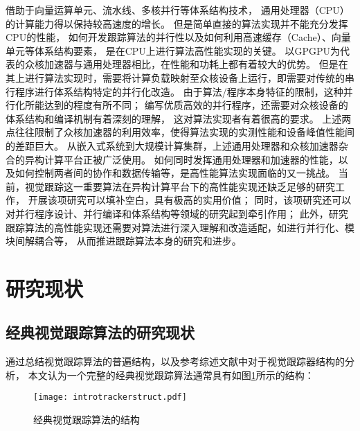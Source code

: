 借助于向量运算单元、流水线、多核并行等体系结构技术，
通用处理器（CPU）的计算能力得以保持较高速度的增长。
但是简单直接的算法实现并不能充分发挥CPU的性能，
如何开发跟踪算法的并行性以及如何利用高速缓存（Cache）、向量单元等体系结构要素，
是在CPU上进行算法高性能实现的关键。
以GPGPU为代表的众核加速器与通用处理器相比，在性能和功耗上都有着较大的优势。
但是在其上进行算法实现时，需要将计算负载映射至众核设备上运行，即需要对传统的串行程序进行体系结构特定的并行化改造。
由于算法/程序本身特征的限制，这种并行化所能达到的程度有所不同；
编写优质高效的并行程序，还需要对众核设备的体系结构和编译机制有着深刻的理解，
这对算法实现者有着很高的要求。
上述两点往往限制了众核加速器的利用效率，使得算法实现的实测性能和设备峰值性能间的差距巨大。
从嵌入式系统到大规模计算集群，上述通用处理器和众核加速器杂合的异构计算平台正被广泛使用。
如何同时发挥通用处理器和加速器的性能，以及如何控制两者间的协作和数据传输等，是高性能算法实现面临的又一挑战。
当前，视觉跟踪这一重要算法在异构计算平台下的高性能实现还缺乏足够的研究工作，
开展该项研究可以填补空白，具有极高的实用价值；
同时，该项研究还可以对并行程序设计、并行编译和体系结构等领域的研究起到牵引作用；
此外，研究跟踪算法的高性能实现还需要对算法进行深入理解和改造适配，如进行并行化、模块间解耦合等，
从而推进跟踪算法本身的研究和进步。


\section{研究现状}

\subsection{经典视觉跟踪算法的研究现状}
通过总结视觉跟踪算法的普遍结构，以及参考综述文献\cite{50seqs, Yang2011, Smeulders2014, Wang2015}中对于视觉跟踪器结构的分析，
本文认为一个完整的经典视觉跟踪算法通常具有如图\ref{introtrackerstruct}所示的结构：

\begin{figure}[htb]
\centering
\texttt{[image: introtrackerstruct.pdf]}
\caption{经典视觉跟踪算法的结构}
\label{introtrackerstruct}
\end{figure}

